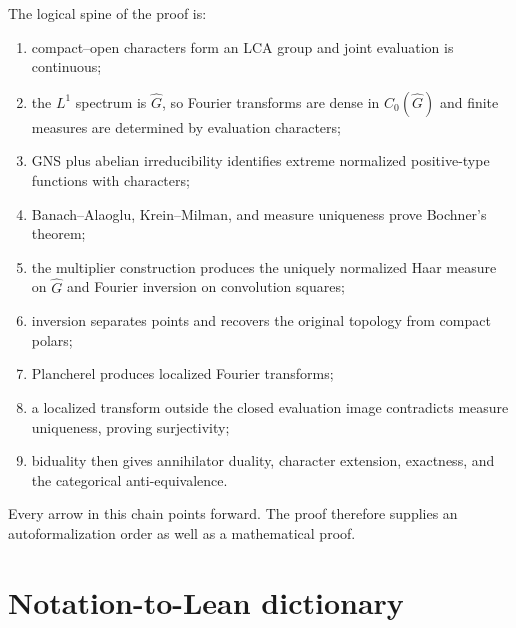 \documentclass[11pt]{article}
\theoremstyle{definition}
\theoremstyle{remark}
\newcommand{\Czero}{C_0}
\newcommand{\Lp}[1]{L^{#1}}
\newcommand{\dual}[1]{\widehat{#1}}
\begin{document}
The logical spine of the proof is:
\begin{enumerate}[label=\arabic*.,leftmargin=2.5em]
\item compact--open characters form an LCA group and joint evaluation is continuous;
\item the $\Lp1$ spectrum is $\dual G$, so Fourier transforms are dense in
$\Czero(\dual G)$ and finite measures are determined by evaluation characters;
\item GNS plus abelian irreducibility identifies extreme normalized positive-type
functions with characters;
\item Banach--Alaoglu, Krein--Milman, and measure uniqueness prove Bochner's theorem;
\item the multiplier construction produces the uniquely normalized Haar measure on
$\dual G$ and Fourier inversion on convolution squares;
\item inversion separates points and recovers the original topology from compact polars;
\item Plancherel produces localized Fourier transforms;
\item a localized transform outside the closed evaluation image contradicts measure
uniqueness, proving surjectivity;
\item biduality then gives annihilator duality, character extension, exactness, and the
categorical anti-equivalence.
\end{enumerate}

Every arrow in this chain points forward.  The proof therefore supplies an
autoformalization order as well as a mathematical proof.

\appendix

\section{Notation-to-Lean dictionary}
\label{app:dictionary}
\end{document}
